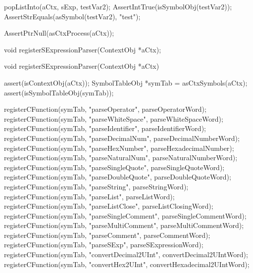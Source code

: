   popListInto(aCtx, sExp, testVar2);
  AssertIntTrue(isSymbolObj(testVar2));
  AssertStrEquals(asSymbol(testVar2), "test");
  
  AssertPtrNull(asCtxProcess(aCtx));
\stopCTest
\stopTestCase
\stopTestSuite

\startCHeader
void registerSExpressionParser(ContextObj *aCtx);
\stopCHeader

\startCCode
void registerSExpressionParser(ContextObj *aCtx) {
  assert(isContextObj(aCtx));
  SymbolTableObj *symTab = asCtxSymbols(aCtx);
  assert(isSymbolTableObj(symTab));
  
  registerCFunction(symTab, "parseOperator",       parseOperatorWord);
  registerCFunction(symTab, "parseWhiteSpace",     parseWhiteSpaceWord);
  registerCFunction(symTab, "parseIdentifier",     parseIdentifierWord);
  registerCFunction(symTab, "parseDecimalNum",     parseDecimalNumberWord);
  registerCFunction(symTab, "parseHexNumber",      parseHexadecimalNumber);
  registerCFunction(symTab, "parseNaturalNum",     parseNaturalNumberWord);
  registerCFunction(symTab, "parseSingleQuote",    parseSingleQuoteWord);
  registerCFunction(symTab, "parseDoubleQuote",    parseDoubleQuoteWord);
  registerCFunction(symTab, "parseString",         parseStringWord);
  registerCFunction(symTab, "parseList",           parseListWord);
  registerCFunction(symTab, "parseListClose",      parseListClosingWord);
  registerCFunction(symTab, "parseSingleComment",  parseSingleCommentWord);
  registerCFunction(symTab, "parseMultiComment",   parseMultiCommentWord);
  registerCFunction(symTab, "parseComment",        parseCommentWord);
  registerCFunction(symTab, "parseSExp",           parseSExpressionWord);
  registerCFunction(symTab, "convertDecimal2UInt", convertDecimal2UIntWord);
  registerCFunction(symTab, "convertHex2UInt",     convertHexadecimal2UIntWord);
}
\stopCCode
